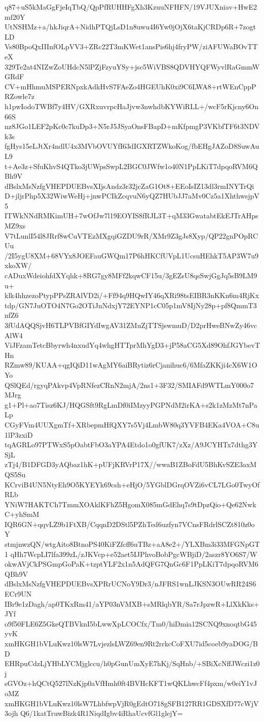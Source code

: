q87+uS5kMaGgFjeIqTbQ/QpPfRUHHFgXh3KzuuNFHFN/19VJUXniav+HwE2mf20Y
UtNSHMz+a/hkJiqrA+NidhPTQjLsD1n8uwu4I6Yw0jOjX6taKjCRDp6R+7zogtLD
Vs80BpoQxIIInfOLpVV3+ZRc22T3mKWet1ansPis6hj4fryPW/ziAFUWaBOvTTeX
329Te2at4NIZwZoUHdcN5lPZjFzyuYSy+jsc5WiVBS8QDVHYQFWyvlRaGmmWGRdF
CV+mHhmuMSPERNpxkAdkHvS7FAeZo4HGEUhK0xi9C6LWA8+rtWEnCppPRZowle7z
h1pwIodoTWBf7y4HV/GXRxuvrpcHaJjvw3nwhdbKYWiRLL+/wcF5rKjcny6On66S
nz8JGo1LEF2pKc0c7kuDp3+N5rJ5JSyaOnsFBapD+mKfpmgP3VKbfTF6t3NDVk3s
fgHys15eLJtXr4ndlU4x3MVbOVUYfI63dIGXRTZWkoKog/fbEHgJAZoD8SuwAuL9
t+Ae3z+SfuKhvS4QTko3jUWpsSwpL2BGC0JWfw1o40N1PpLKiT7dpqoRVM6QBh9V
dBslxMsNzfgVHEPDUEBvsXIjsAndz3r32jcZaG1Ot8+EEoIsIZ13dl3rmINYTrQi
D+jljrPhp5X32WiwWeHj+jnwPCIkZcqvuN6yQZ7HUbJJ7aMv0Cz5a1XhthwsjpV5
ITWkNNdRMKimUH+7wOfJw7l19EOYIS8fRJL3T+qM33GwatabtEkEJTrAHpsMZ9xs
V7tLunlI54l8JRrf8wCuVTEzMXgqiGZDU9rR/XMr9Z3gJs8Xyp/QP22gnPOpRCUu
/2I5ygU8XM+68VYx8JOEFauGWQm17P6hHKCfUVpL1UcsuHEhkT5AP3W7u9xkoXW/
cADuxWdeiohfdXYqhk+8RG7gy8MFf2kqwCF15u/3gEZsU8qsSwjGgJq5sB9LM9u+
klk4hhzezoPtypPPsZRAlVD2i/+Ff94q9HQwIY46qXRi98tsEIBR3nKKn6m4RjKx
tdp/GN7JuOTO4N7Go2OTiJnNdxjY72EYNP1cC05p1mV8IjNy28p+pf8QmmT3nfZ6
3fUdAQQSjvH6TLPVBfGIYdIwgAV31ZMuZjTTSjswmuD/D2prHweBNwZy46vcAlW4
ViJFzamTetcBbyrwh4nxudYq4whgHTTprMhYgD3+jP58aCG5Xd89OhfJGYbevTHn
RZmw89/KUAA+qgIQiD11wAgMY6aiBRytiz6rCjanihuc6/6MfaZKKji4cX6W1OYo
QSlQEd/rgyqPAkvp4VpRNfezCRnN2mjA/2ns1+3F32/SMIAFd9WTLmY000o7MJrg
g1+Pl+ao7Tisz6KJ/HQGSft9RgLmDf0iIMzyyPGPNdM2irKA+s2k1zMzMt7nPaLp
CGyFVm4UUXgmTf+XRbepmHfQXY7s5Vj4LmbW80q3YVFB4EKa4VOA+C8u1lP3zxiD
tqAGRLo97PTWxS5pOabtFbO3aYPA4Etdo1o0gfUK7/zXz/A9JCYHTx7dthg3YSjL
zTj4/B1DFGD3yAQbaz1hK+pUFjKRVrP17X//wwaB1ZBoFdU5BhKvSZE3axMQS5Su
KCrviB4UN5NtyEh9O5KYEYk69csh+eHjO/5YGblDGrqOVZi6vCL7LGo0TwyOfRLb
YNiW7HAKTCh7TmmXOAklKFhZ5HgomX085mGdEhq7s9tDpzQio+Qe62NwkC+yhSmM
IQR6GN+qqvLZ9b1FtXB/CqqnD2DStl5PZhTed6uzfyn7VCnsFRdrlSCZt810z0oY
stmjnwzQN/wtgAito8BtnoPS40KiFZfcff6uTBz+aA8e2+/YLXBm3i33MFGNpGT1
qHh7WcpLI7lfa399zL/zJKVcp+e52aet5IJPhvoBobPgcWBjiD/2aszr8YO6S7/W
okwAVjCkPSGmpGoPaK+tzptYLF2x1n5AdQFG7QnGc6F1PpLKiT7dpqoRVM6QBh9V
dBslxMsNzfgVHEPDUEBvsXPRrUCNoY9Dr3/nJFRS1wnLJKSN3OUwRR24S6ECr9UN
IBr9e1zDagh/ap0TKxRm41/aYP03nVMXB+sMRlqbYR/Sa7rJpzwR+LlXkKks+JYf
o9f50FLE6Z5GkeQTBVknI5bLwwXpLCOCfx/Tm0/hiDmia12SCNQ9xnoqtbG45yvK
xmHKGH1bVLuKwz10lsW7LvjezlsLWZ69en9Rt2rrkcCoFXU7id5coeb9yaDOG/BD
EHRpuCdzLjYHbLYCMjglccu/h0pGunUmXyE7hKj/SqHnb/+SBiXcNffJWczi1z0j
sGVOz+hQCtQ527lNzKjp0aVfHmh0ft4BVHcKFT1wQKLhwcFf4pxm/w0eiY1vJoMZ
xmHKGH1bVLuKwz10lsW7LhbfwpVjR0gEdtO718gSFB127RR1GDSXfD77cWjV3ojh
Q6/1katTruwBizk4R1NiqdIgbv4iRhaUcvfGl1glejY=
